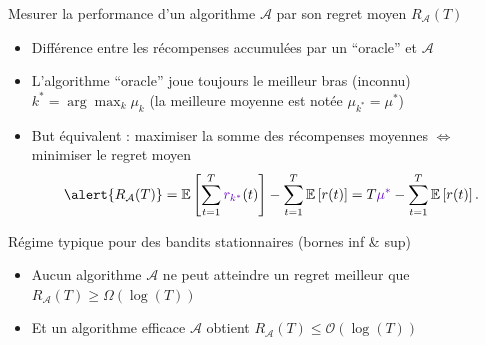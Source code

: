 \documentclass[11pt,french,ignorenonframetext,]{beamer}
\begin{document}
\begin{frame}{Mesurer la performance d'un algorithme $\mathcal{A}$ par son regret moyen $R_{\mathcal{A}}(T)$}

\begin{itemize}[<+->]
  \item
  Différence entre les récompenses accumulées par un ``oracle'' et $\mathcal{A}$

  \item
  L'algorithme ``oracle'' joue toujours \textcolor{deeppurple}{le meilleur bras (inconnu) $k^* = \arg\max_k \mu_k$} (la meilleure moyenne est notée \textcolor{deeppurple}{$\mu_{k^*} = \mu^*$})

  \item
  But équivalent : maximiser la somme des récompenses moyennes
  $\Longleftrightarrow$ \alert{minimiser le regret moyen}
  \[ \alert{ R_{\mathcal{A}}(T) } = \mathbb{E}\left[ \sum\limits_{t=1}^T \textcolor{deeppurple}{r_{k^*}}(t) \right] - \sum\limits_{t=1}^T \mathbb{E}\left[ r(t) \right] = T \textcolor{deeppurple}{\mu^*} - \sum\limits_{t=1}^T \mathbb{E}\left[ r(t) \right]. \]

\end{itemize}

\pause
\vspace*{10pt}

\begin{exampleblock}{Régime typique pour des bandits stationnaires (bornes inf \& sup)}
  \begin{itemize}
  \item
  Aucun algorithme $\mathcal{A}$ ne peut atteindre un regret meilleur que
  \hfill{}
  $R_{\mathcal{A}}(T) \geq \Omega(\log(T))$

  \item
  Et un algorithme efficace $\mathcal{A}$ obtient
  \hfill{}
  $R_{\mathcal{A}}(T) \leq \mathcal{O}(\log(T))$
  \end{itemize}
\end{exampleblock}

\end{frame}



\end{document}
